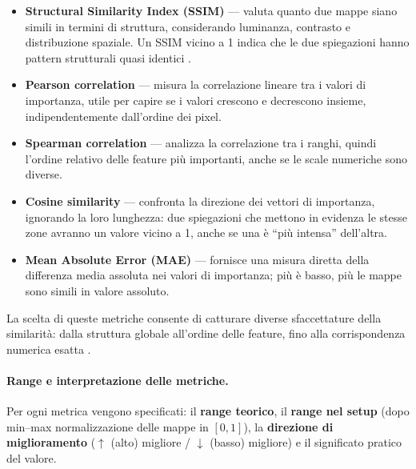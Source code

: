 \documentclass[12pt,a4paper,oneside]{report}
\numberwithin{figure}{chapter}
\numberwithin{table}{chapter}
\begin{document}
\begin{itemize}
      \item \textbf{Structural Similarity Index (SSIM)} — valuta quanto due mappe siano simili in termini di struttura, considerando luminanza, contrasto e distribuzione spaziale. Un SSIM vicino a 1 indica che le due spiegazioni hanno pattern strutturali quasi identici \citep{wang2004ssim}.
      \item \textbf{Pearson correlation} — misura la correlazione lineare tra i valori di importanza, utile per capire se i valori crescono e decrescono insieme, indipendentemente dall’ordine dei pixel.
      \item \textbf{Spearman correlation} — analizza la correlazione tra i ranghi, quindi l’ordine relativo delle feature più importanti, anche se le scale numeriche sono diverse.
      \item \textbf{Cosine similarity} — confronta la direzione dei vettori di importanza, ignorando la loro lunghezza: due spiegazioni che mettono in evidenza le stesse zone avranno un valore vicino a 1, anche se una è ``più intensa'' dell’altra.
      \item \textbf{Mean Absolute Error (MAE)} — fornisce una misura diretta della differenza media assoluta nei valori di importanza; più è basso, più le mappe sono simili in valore assoluto.
\end{itemize}

La scelta di queste metriche consente di catturare diverse sfaccettature della
similarità: dalla struttura globale all’ordine delle feature, fino alla
corrispondenza numerica esatta \citep{leventi2023consistency,
      samek2016evaluating}.

\paragraph{Range e interpretazione delle metriche.}
Per ogni metrica vengono specificati: il \textbf{range teorico}, il
\textbf{range nel setup} (dopo min–max normalizzazione delle mappe in $[0,1]$),
la \textbf{direzione di miglioramento} ($\uparrow$ (alto) migliore /
$\downarrow$ (basso) migliore) e il significato pratico del valore.
\end{document}
